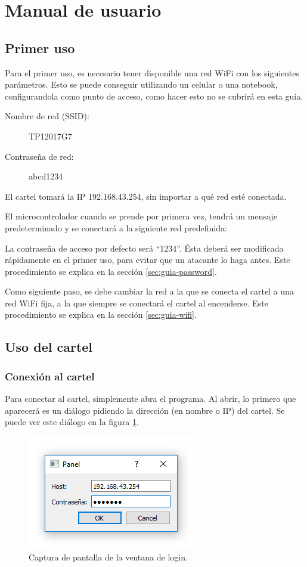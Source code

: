 \section{Manual de usuario} \label{sec:manual-usuario}

\subsection{Primer uso}\label{sec:primer-uso}
Para el primer uso, es necesario tener disponible una red WiFi con los siguientes parámetros. Esto se puede conseguir utilizando un celular o una notebook, configurandola como punto de acceso, como hacer esto no se cubrirá en esta guía.

\begin{description}
	\item[Nombre de red (SSID):] TP12017G7
	\item[Contraseña de red:] abcd1234
\end{description}

El cartel tomará la IP 192.168.43.254, sin importar a qué red esté conectada.

El microcontrolador cuando se prende por primera vez, tendrá un mensaje predeterminado y se conectará a la siguiente red predefinida:

La contraseña de acceso por defecto será \enquote{1234}. Ésta deberá ser modificada rápidamente en el primer uso, para evitar que un atacante lo haga antes. Este procedimiento se explica en la sección \ref{sec:guia-password}.

Como siguiente paso, se debe cambiar la red a la que se conecta el cartel a una red WiFi fija, a la que siempre se conectará el cartel al encenderse. Este procedimiento se explica en la sección \ref{sec:guia-wifi}.

\subsection{Uso del cartel}\label{sec:guia-uso}
\subsubsection{Conexión al cartel}\label{sec:guia-conexion}
Para conectar al cartel, simplemente abra el programa. Al abrir, lo primero que aparecerá es un diálogo pidiendo la dirección (en nombre o IP) del cartel.  Se puede ver este diálogo en la figura \ref{fig:scr-login}.

\begin{figure}[ht]
	\centering
	\includegraphics[scale=0.8]{imagenes/scr-login.png}
	\caption{Captura de pantalla de la ventana de login.}
	\label{fig:scr-login}
\end{figure}

